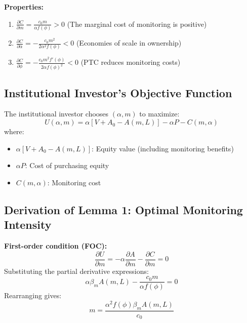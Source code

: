 \documentclass[12pt,a4paper]{article}
\begin{document}
\textbf{Properties:}
\begin{enumerate}
    \item $\frac{\partial C}{\partial m} = \frac{c_0 m}{\alpha f(\phi)} > 0$ (The marginal cost of monitoring is positive)
    \item $\frac{\partial C}{\partial \alpha} = -\frac{c_0 m^2}{2 \alpha^2 f(\phi)} < 0$ (Economies of scale in ownership)
    \item $\frac{\partial C}{\partial \phi} = -\frac{c_0 m^2 f'(\phi)}{2 \alpha f(\phi)^2} < 0$ (PTC reduces monitoring costs)
\end{enumerate}

\subsection{Institutional Investor's Objective Function}
The institutional investor chooses $(\alpha, m)$ to maximize:
\begin{equation}
U(\alpha, m) = \alpha [V + A_0 - A(m, L)] - \alpha P - C(m, \alpha)
\end{equation}
where:
\begin{itemize}
    \item $\alpha [V + A_0 - A(m, L)]$: Equity value (including monitoring benefits)
    \item $\alpha P$: Cost of purchasing equity
    \item $C(m, \alpha)$: Monitoring cost
\end{itemize}

\subsection{Derivation of Lemma 1: Optimal Monitoring Intensity}
\textbf{First-order condition (FOC):}
\begin{equation}
\frac{\partial U}{\partial m} = -\alpha \frac{\partial A}{\partial m} - \frac{\partial C}{\partial m} = 0
\end{equation}
Substituting the partial derivative expressions:
\begin{equation}
\alpha \beta_m A(m, L) - \frac{c_0 m}{\alpha f(\phi)} = 0
\end{equation}
Rearranging gives:
\begin{equation}
m = \frac{\alpha^2 f(\phi) \beta_m A(m, L)}{c_0}
\end{equation}
\end{document}
